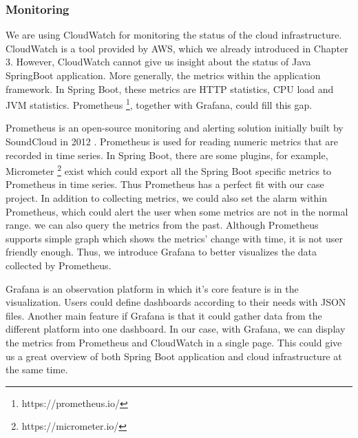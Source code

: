 \subsubsection{Monitoring}
We are using CloudWatch for monitoring the status of the cloud infrastructure. CloudWatch is a tool provided by AWS, which we already introduced in Chapter 3. However, CloudWatch cannot give us insight about the status of Java SpringBoot application. More generally, the metrics within the application framework. In Spring Boot, these metrics are HTTP statistics, CPU load and JVM statistics. Prometheus \footnote{https://prometheus.io/}, together with Grafana, could fill this gap.
\par
Prometheus is an open-source monitoring and alerting solution initially built by SoundCloud in 2012 \cite{Overview30:online}. Prometheus is used for reading numeric metrics that are recorded in time series. In Spring Boot, there are some plugins, for example, Micrometer \footnote{https://micrometer.io/} exist which could export all the Spring Boot specific metrics to Prometheus in time series. Thus Prometheus has a perfect fit with our case project. In addition to collecting metrics, we could also set the alarm within Prometheus, which could alert the user when some metrics are not in the normal range. we can also query the metrics from the past. Although Prometheus supports simple graph which shows the metrics' change with time, it is not user friendly enough. Thus, we introduce Grafana to better visualizes the data collected by Prometheus.
\par
Grafana is an observation platform in which it's core feature is in the visualization. Users could define dashboards according to their needs with JSON files. Another main feature if Grafana is that it could gather data from the different platform into one dashboard. In our case, with Grafana, we can display the metrics from Prometheus and CloudWatch in a single page. This could give us a great overview of both Spring Boot application and cloud infrastructure at the same time.
